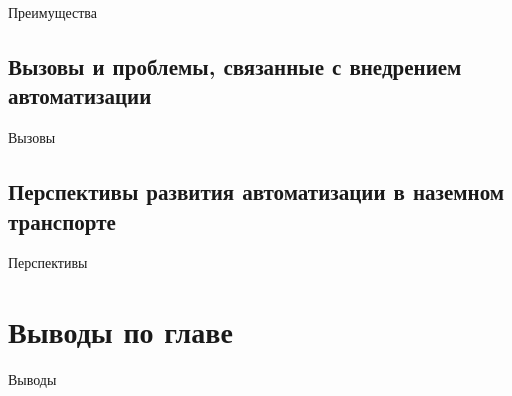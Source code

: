 Преимущества

\subsection{Вызовы и проблемы, связанные с внедрением автоматизации}\label{subsec:ch1/sec3/sub2}

Вызовы

\subsection{Перспективы развития автоматизации в наземном транспорте}\label{subsec:ch1/sec3/sub3}

Перспективы

\section{Выводы по главе}\label{sec:ch1/sec4}

Выводы

\FloatBarrier

